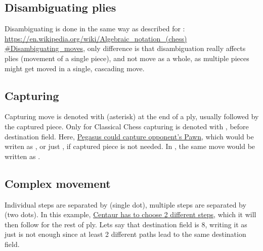 \clearpage %

\subsection*{Disambiguating plies}
\label{sec:Appendix/Disambiguating plies}

Disambiguating is done in the same way as described for :
\href{https://en.wikipedia.org/wiki/Algebraic\_notation\_(chess)\#Disambiguating\_moves}{https://en.wikipedia.org/wiki/Algebraic\_notation\_(chess)\\
\#Disambiguating\_moves},
only difference is that disambiguation really affects plies (movement of a single piece),
and not move as a whole, as multiple pieces might get moved in a single, cascading move.

\subsection*{Capturing}
\label{sec:Appendix/Capturing}

Capturing move is denoted with \alg{*} (asterisk) at the end of a ply, usually followed
by the captured piece. Only for Classical Chess capturing is denoted with ,
before destination field. Here,
\hyperref[fig:scn_ct_04_pegasus_movement]{Pegasus could capture opponent's Pawn}, which
would be writen as , or just , if captured piece is not needed.
In , the same move would be written as .

\clearpage %

\subsection*{Complex movement}
\label{sec:Appendix/Complex movement}

Individual steps are separated by  (single dot), multiple steps are separated by  (two dots).
In this example, \hyperref[fig:scn_hd_03_centaur_multi_step]{Centaur has to choose 2 different steps},
which it will then follow for the rest of ply. Lets say that destination field is 8, writing it as
just  is not enough since at least 2 different paths lead to the same destination field.

